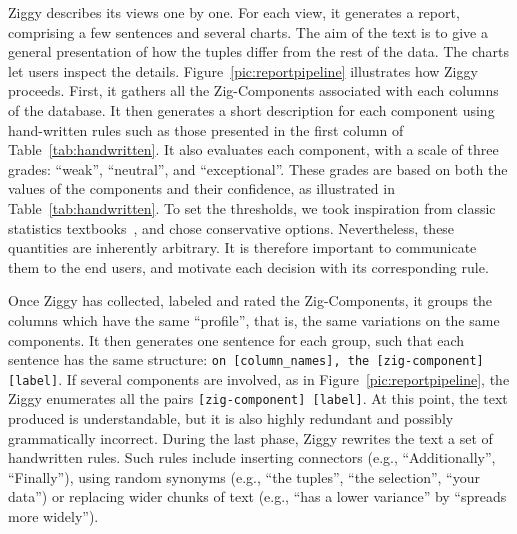 Ziggy describes its views one by one. For each view, it generates a report,
comprising a few sentences and several charts. The aim of the text is to give a
general presentation of how the tuples differ from the rest of the data. The
charts let users inspect the details.  Figure~\ref{pic:reportpipeline}
illustrates how Ziggy proceeds. First, it gathers all the Zig-Components
associated with each columns of the database. It then generates a short
description for each component using hand-written rules such as those
presented in the first column of Table~\ref{tab:handwritten}. It also evaluates
each component, with a scale of three grades: ``weak'', ``neutral'', and
``exceptional''. These grades are based on both the values of the components
and their confidence, as illustrated in Table~\ref{tab:handwritten}.  To set
the thresholds, we took inspiration from classic statistics
textbooks~\cite{cohen1977statistical}, and chose conservative options.
Nevertheless, these quantities are inherently arbitrary. It is therefore
important to communicate them to the end users, and motivate each decision with
its corresponding rule.

Once Ziggy has collected, labeled and rated the Zig-Comp\-onents, it  groups
the columns which have the same ``profile'', that is, the same variations on
the same components. It then generates one sentence for each group, such that
each sentence has the same structure: \texttt{on [column\_names], the
[zig-component] [label]}. If several components are involved, as in
Figure~\ref{pic:reportpipeline}, the Ziggy enumerates all the pairs
\texttt{[zig-component] [label]}. At this point, the text produced is
understandable, but it is also highly redundant and possibly grammatically
incorrect. During the last phase, Ziggy rewrites the text a set of handwritten
rules. Such rules include inserting connectors (e.g., ``Additionally'',
``Finally''), using random synonyms (e.g., ``the tuples'', ``the selection'',
``your data'') or replacing wider chunks of text (e.g., ``has a lower
variance'' by ``spreads more widely'').

